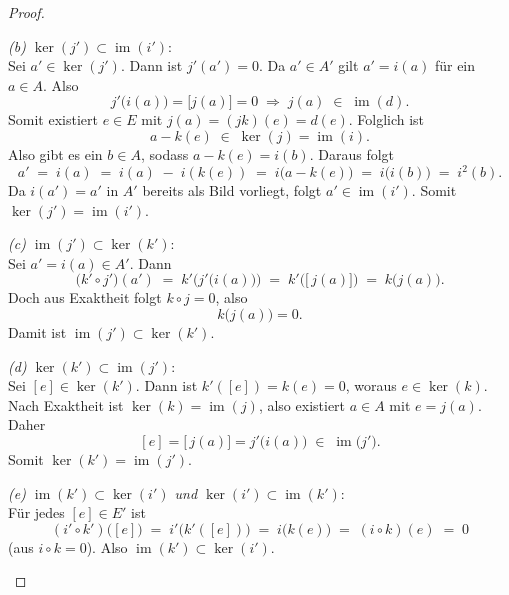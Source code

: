 \documentclass[12pt, hidelinks]{article}
\numberwithin{conj}{section}
\newcommand{\ima}{\operatorname{im}}
\begin{document}
\begin{proof}
\begin{enumerate}[nolistsep]
              \emph{(b) $\ker(j') \subset \ima(i')$}:\\
              Sei $a' \in \ker(j')$. Dann ist $j'(a') = 0$. Da $a' \in A'$ gilt $a' = i(a)$ für ein $a \in A$. Also
              \[
                j'\bigl(i(a)\bigr) = \bigl[j(a)\bigr] = 0 
                \;\Longrightarrow\;
                j(a) \;\in\; \ima(d).
              \]
              Somit existiert $e \in E$ mit $j(a) = (jk)(e) = d(e)$. Folglich ist
              \[
                a - k(e) \;\in\; \ker(j) = \ima(i).
              \]
              Also gibt es ein $b \in A$, sodass $a - k(e) = i(b)$. Daraus folgt
              \[
                a' \;=\; i(a)
                \;=\; i(a) \;-\; i(k(e)) \;=\; i\bigl(a - k(e)\bigr)
                \;=\; i\bigl(i(b)\bigr)
                \;=\; i^2(b).
              \]
              Da $i(a') = a'$ in $A'$ bereits als Bild vorliegt, folgt $a' \in \ima(i')$. Somit $\ker(j') = \ima(i')$.
              
              \emph{(c) $\ima(j') \subset \ker(k')$}:\\
              Sei $a' = i(a) \in A'$. Dann
              \[
                \bigl(k' \circ j'\bigr)(a')
                \;=\;
                k'\bigl(j'\bigl(i(a)\bigr)\bigr)
                \;=\;
                k'\bigl([\,j(a)\bigr])
                \;=\;
                k\bigl(j(a)\bigr).
              \]
              Doch aus Exaktheit folgt $k \circ j = 0$, also
              \[
                k\bigl(j(a)\bigr) = 0.
              \]
              Damit ist $\ima(j') \subset \ker(k')$.
              
              \emph{(d) $\ker(k') \subset \ima(j')$}:\\
              Sei $[e] \in \ker(k')$. Dann ist $k'( [e] ) = k(e) = 0$, woraus $e \in \ker(k)$. Nach Exaktheit ist $\ker(k) = \ima(j)$, also existiert $a \in A$ mit $e = j(a)$. Daher
              \[
                [e] = [\,j(a)\bigr] = j'\bigl(i(a)\bigr) \;\in\; \ima\bigl(j'\bigr).
              \]
              Somit $\ker(k') = \ima(j')$.
              
              \emph{(e) $\ima(k') \subset \ker(i')$ und $\ker(i') \subset \ima(k')$}:\\
              Für jedes $[e] \in E'$ ist
              \[
                (i' \circ k')\bigl([e]\bigr)
                \;=\;
                i'\bigl(k'( [e] )\bigr)
                \;=\;
                i\bigl(k(e)\bigr)
                \;=\;
                (i \circ k)(e)
                \;=\;
                0
              \]
              (aus $i \circ k = 0$). Also $\ima(k') \subset \ker(i')$.
              

\end{enumerate}
\end{proof}
\end{document}
